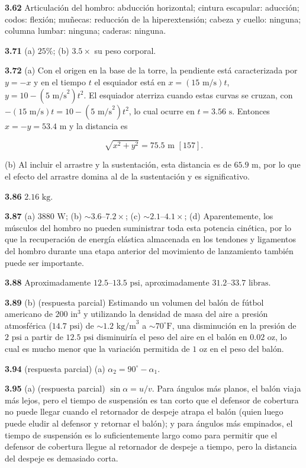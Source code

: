 \documentclass[12pt,a4paper]{book}
\begin{document}
\noindent \textbf{3.62} Articulación del hombro: abducción horizontal; cintura escapular: aducción; codos: flexión; muñecas: reducción de la hiperextensión; cabeza y cuello: ninguna; columna lumbar: ninguna; caderas: ninguna.

\noindent \textbf{3.71} (a) $25\%$; (b) $3.5\times$ su peso corporal.

\noindent \textbf{3.72} (a) Con el origen en la base de la torre, la pendiente está caracterizada por $y = -x$ y en el tiempo $t$ el esquiador está en $x = (15\text{ m/s})t$, $y = 10 - (5\text{ m/s}^2)t^2$. El esquiador aterriza cuando estas curvas se cruzan, con $-(15\text{ m/s})t = 10 - (5\text{ m/s}^2)t^2$, lo cual ocurre en $t = 3.56\text{ s}$. Entonces $x = -y = 53.4\text{ m}$ y la distancia es

\begin{equation*}
\sqrt{x^2 + y^2} = 75.5\text{ m } [157].
\end{equation*}

(b) Al incluir el arrastre y la sustentación, esta distancia es de $65.9\text{ m}$, por lo que el efecto del arrastre domina al de la sustentación y es significativo.

\noindent \textbf{3.86} $2.16\text{ kg}$.

\noindent \textbf{3.87} (a) $3880\text{ W}$; (b) $\sim 3.6\text{--}7.2\times$; (c) $\sim 2.1\text{--}4.1\times$; (d) Aparentemente, los músculos del hombro no pueden suministrar toda esta potencia cinética, por lo que la recuperación de energía elástica almacenada en los tendones y ligamentos del hombro durante una etapa anterior del movimiento de lanzamiento también puede ser importante.

\noindent \textbf{3.88} Aproximadamente $12.5\text{--}13.5\text{ psi}$, aproximadamente $31.2\text{--}33.7\text{ libras}$.

\noindent \textbf{3.89} (b) (respuesta parcial) Estimando un volumen del balón de fútbol americano de $200\text{ in}^3$ y utilizando la densidad de masa del aire a presión atmosférica ($14.7\text{ psi}$) de $\sim 1.2\text{ kg/m}^3$ a $\sim 70^\circ\text{F}$, una disminución en la presión de $2\text{ psi}$ a partir de $12.5\text{ psi}$ disminuiría el peso del aire en el balón en $0.02\text{ oz}$, lo cual es mucho menor que la variación permitida de $1\text{ oz}$ en el peso del balón.

\noindent \textbf{3.94} (respuesta parcial) (a) $\alpha_2 = 90^\circ - \alpha_1$.

\noindent \textbf{3.95} (a) (respuesta parcial) $\sin\alpha = u/v$. Para ángulos más planos, el balón viaja más lejos, pero el tiempo de suspensión es tan corto que el defensor de cobertura no puede llegar cuando el retornador de despeje atrapa el balón (quien luego puede eludir al defensor y retornar el balón); y para ángulos más empinados, el tiempo de suspensión es lo suficientemente largo como para permitir que el defensor de cobertura llegue al retornador de despeje a tiempo, pero la distancia del despeje es demasiado corta.
\end{document}
